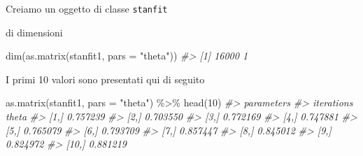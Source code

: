 \documentclass[
  11pt,
  italian,
  a4paper,
  extrafontsizes,onecolumn,openright
  ]{memoir}
\newenvironment{Shaded}{\begin{snugshade}}{\end{snugshade}}
\newcommand{\AttributeTok}[1]{\textcolor[rgb]{0.77,0.63,0.00}{#1}}
\newcommand{\CommentTok}[1]{\textcolor[rgb]{0.56,0.35,0.01}{\textit{#1}}}
\newcommand{\DecValTok}[1]{\textcolor[rgb]{0.00,0.00,0.81}{#1}}
\newcommand{\FunctionTok}[1]{\textcolor[rgb]{0.00,0.00,0.00}{#1}}
\newcommand{\NormalTok}[1]{#1}
\newcommand{\OtherTok}[1]{\textcolor[rgb]{0.56,0.35,0.01}{#1}}
\newcommand{\SpecialCharTok}[1]{\textcolor[rgb]{0.00,0.00,0.00}{#1}}
\newcommand{\StringTok}[1]{\textcolor[rgb]{0.31,0.60,0.02}{#1}}
\begin{document}
\begin{Shaded}
\end{Shaded}

Creiamo un oggetto di classe \texttt{stanfit}

\begin{Shaded}
\end{Shaded}

\noindent
di dimensioni

\begin{Shaded}
\begin{Highlighting}[]
\FunctionTok{dim}\NormalTok{(}\FunctionTok{as.matrix}\NormalTok{(stanfit1, }\AttributeTok{pars =} \StringTok{"theta"}\NormalTok{))}
\CommentTok{\#\textgreater{} [1] 16000     1}
\end{Highlighting}
\end{Shaded}

\noindent
I primi 10 valori sono presentati qui di seguito

\begin{Shaded}
\begin{Highlighting}[]
\FunctionTok{as.matrix}\NormalTok{(stanfit1, }\AttributeTok{pars =} \StringTok{"theta"}\NormalTok{) }\SpecialCharTok{\%\textgreater{}\%}
  \FunctionTok{head}\NormalTok{(}\DecValTok{10}\NormalTok{)}
\CommentTok{\#\textgreater{}           parameters}
\CommentTok{\#\textgreater{} iterations    theta}
\CommentTok{\#\textgreater{}       [1,] 0.757239}
\CommentTok{\#\textgreater{}       [2,] 0.703550}
\CommentTok{\#\textgreater{}       [3,] 0.772169}
\CommentTok{\#\textgreater{}       [4,] 0.747881}
\CommentTok{\#\textgreater{}       [5,] 0.765079}
\CommentTok{\#\textgreater{}       [6,] 0.793709}
\CommentTok{\#\textgreater{}       [7,] 0.857447}
\CommentTok{\#\textgreater{}       [8,] 0.845012}
\CommentTok{\#\textgreater{}       [9,] 0.824972}
\CommentTok{\#\textgreater{}      [10,] 0.881219}
\end{Highlighting}
\end{Shaded}
\end{document}
